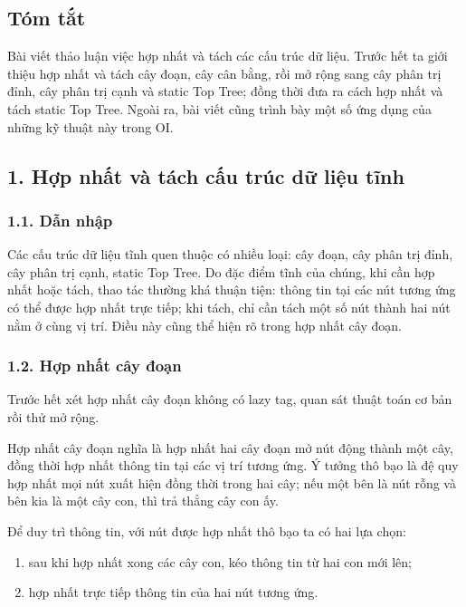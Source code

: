 \documentclass[11pt]{article}
\begin{document}
\subsection*{Tóm tắt}

Bài viết thảo luận việc hợp nhất và tách các cấu trúc dữ liệu. Trước hết ta
giới thiệu hợp nhất và tách cây đoạn, cây cân bằng, rồi mở rộng sang cây phân
trị đỉnh, cây phân trị cạnh và static Top Tree; đồng thời đưa ra cách hợp nhất
và tách static Top Tree. Ngoài ra, bài viết cũng trình bày một số ứng dụng của
những kỹ thuật này trong OI.

\subsection*{1. Hợp nhất và tách cấu trúc dữ liệu tĩnh}

\subsubsection*{1.1. Dẫn nhập}

Các cấu trúc dữ liệu tĩnh quen thuộc có nhiều loại: cây đoạn, cây phân trị
đỉnh, cây phân trị cạnh, static Top Tree. Do đặc điểm tĩnh của chúng, khi cần
hợp nhất hoặc tách, thao tác thường khá thuận tiện: thông tin tại các nút tương
ứng có thể được hợp nhất trực tiếp; khi tách, chỉ cần tách một số nút thành hai
nút nằm ở cùng vị trí. Điều này cũng thể hiện rõ trong hợp nhất cây đoạn.

\subsubsection*{1.2. Hợp nhất cây đoạn}

Trước hết xét hợp nhất cây đoạn không có lazy tag, quan sát thuật toán cơ bản
rồi thử mở rộng.

Hợp nhất cây đoạn nghĩa là hợp nhất hai cây đoạn mở nút động thành một cây, đồng
thời hợp nhất thông tin tại các vị trí tương ứng. Ý tưởng thô bạo là đệ quy hợp
nhất mọi nút xuất hiện đồng thời trong hai cây; nếu một bên là nút rỗng và bên
kia là một cây con, thì trả thẳng cây con ấy.

Để duy trì thông tin, với nút được hợp nhất thô bạo ta có hai lựa chọn:
\begin{enumerate}
  \item sau khi hợp nhất xong các cây con, kéo thông tin từ hai con mới lên;
  \item hợp nhất trực tiếp thông tin của hai nút tương ứng.
\end{enumerate}
\end{document}
